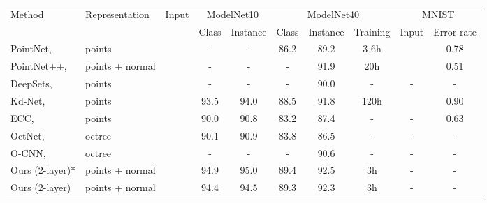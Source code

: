 \documentclass[10pt,twocolumn,letterpaper]{article}
\begin{document}
\begin{table*}[t]
\centering
{
\setlength\tabcolsep{4.5pt} \begin{tabular}{ll||c|cc|ccc||cc}
\hline
\multirow{2}{*}{Method} & \multirow{2}{*}{Representation} & \multirow{2}{*}{Input} & \multicolumn{2}{c|}{ModelNet10} & \multicolumn{3}{c||}{ModelNet40}  & \multicolumn{2}{c}{MNIST} \\
                        &                                 &                        & Class         & Instance        & Class & Instance & Training & Input      & Error rate     \\ \hline
PointNet, \cite{qi2016pointnet}& points                          &                    & -             & -               & 86.2  & 89.2     & 3-6h          &       & 0.78         \\
PointNet++, \cite{qi2017pointnet++}& points + normal                 &                    & -             & -               & -     & 91.9     & 20h           &       & 0.51         \\
DeepSets, \cite{ravanbakhsh2016deep, zaheer2017deep}& points                          &                    & -             & -               & -     & 90.0     & -             &-            & -            \\
Kd-Net, \cite{klokov2017escape}& points                          &    & 93.5          & 94.0            & 88.5  & 91.8     & 120h          &      & 0.90         \\
ECC, \cite{simonovsky2017dynamic}& points                          &                    & 90.0          & 90.8            & 83.2  & 87.4     & -             & -          & 0.63         \\
OctNet, \cite{Riegler2017OctNet}& octree                          &   & 90.1          & 90.9            & 83.8  & 86.5     & -             &-            & -            \\
O-CNN, \cite{wang2017cnn}& octree                          &    & -             & -               & -     & 90.6     & -             &-            & -            \\ 
\hline
Ours (2-layer)*         & points + normal                 &                    & 94.9          & 95.0            & 89.4  & 92.5     & 3h            & -      & -         \\
Ours (2-layer)          & points + normal                 &                    & 94.4          & 94.5            & 89.3  & 92.3     & 3h            & -           & -            \\

\end{tabular}}
\end{table*}
\end{document}
